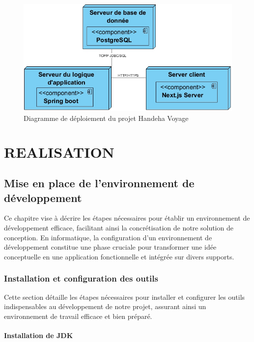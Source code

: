 \documentclass[12pt]{report}
\begin{document}
			\begin{figure}[h]
				\centering
				\includegraphics[width=\textwidth]{DDep.jpg}
				\caption{Diagramme  de déploiement du projet Handeha Voyage}
				\label{fig:DDep}
			\end{figure}
			\clearpage



			\part{REALISATION}

			\chapter{Mise en place de l’environnement de développement}

			\hspace{15pt} Ce chapitre vise à décrire les étapes nécessaires pour établir un environnement de développement efficace, facilitant ainsi la concrétisation de notre solution de conception. En informatique, la configuration d’un environnement de développement constitue une phase cruciale pour transformer une idée conceptuelle en une application fonctionnelle et intégrée sur divers supports.
			
			\section{Installation et configuration des outils}
			
			\hspace{15pt} Cette section détaille les étapes nécessaires pour installer et configurer les outils indispensables au développement de notre projet, assurant ainsi un environnement de travail efficace et bien préparé.

			\subsection{Installation de JDK}
\end{document}
